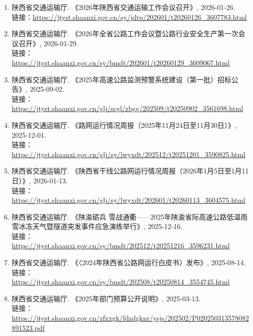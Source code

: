 \begin{enumerate}[leftmargin=2.5em]
\item 陕西省交通运输厅. 《2026年陕西省交通运输工作会议召开》, 2026-01-26. \\
  链接：\url{https://jtyst.shaanxi.gov.cn/sy/jdtp/202601/t20260126_3607783.html}
\item 陕西省交通运输厅. 《2026年全省公路工作会议暨公路行业安全生产第一次会议召开》, 2026-01-29. \\
  链接：\url{https://jtyst.shaanxi.gov.cn/sy/bmdt/202601/t20260129_3609067.html}
\item 陕西省交通运输厅. 《2025年高速公路监测预警系统建设（第一批）招标公告》, 2025-09-02. \\
  链接：\url{https://jtyst.shaanxi.gov.cn/glj/scgl/zbgg/202509/t20250902_3561698.html}
\item 陕西省交通运输厅. 《路网运行情况周报（2025年11月24日至11月30日）》, 2025-12-01. \\
  链接：\url{https://jtyst.shaanxi.gov.cn/glj/sy/lwyxdt/202512/t20251201_3590825.html}
\item 陕西省交通运输厅. 《陕西省干线公路网运行情况周报（2026年1月5日至1月11日）》, 2026-01-13. \\
  链接：\url{https://jtyst.shaanxi.gov.cn/glj/sy/lwyxdt/202601/t20260113_3604575.html}
\item 陕西省交通运输厅. 《陕渝砺兵 雪战通衢——2025年陕渝省际高速公路低温雨雪冰冻天气暨隧道突发事件应急演练举行》, 2025-12-16. \\
  链接：\url{https://jtyst.shaanxi.gov.cn/sy/bmdt/202512/t20251216_3596231.html}
\item 陕西省交通运输厅. 《〈2024年陕西省公路网运行白皮书〉发布》, 2025-08-14. \\
  链接：\url{https://jtyst.shaanxi.gov.cn/sy/bmdt/202508/t20250814_3554745.html}
\item 陕西省交通运输厅. 《2025年部门预算公开说明》, 2025-03-13. \\
  链接：\url{https://jtyst.shaanxi.gov.cn/zfxxgk/fdzdgknr/ysjs/202502/P020250313578082891523.pdf}
\end{enumerate}
